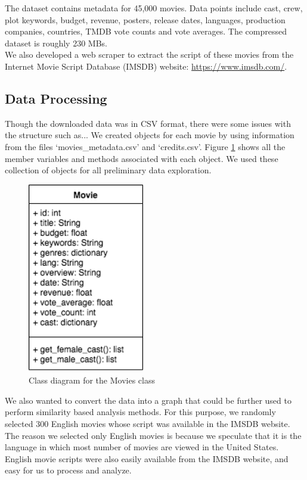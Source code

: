 \documentclass[12pt]{article}
\begin{document}
The dataset contains metadata for 45,000 movies. Data points include cast, crew, plot keywords, budget, revenue, posters, release dates, languages, production companies, countries, TMDB vote counts and vote averages. The compressed dataset is roughly 230 MBs. \\

We also developed a web scraper to extract the script of these movies from the Internet Movie Script Database (IMSDB) website: \url{https://www.imsdb.com/}.

\subsection{Data Processing}
Though the downloaded data was in CSV format, there were some issues with the structure such as... We created objects for each movie by using information from the files `movies\_metadata.csv' and `credits.csv'. Figure \ref{movie} shows all the member variables and methods associated with each object. We used these collection of objects for all preliminary data exploration. \\

\begin{figure}[H]
\begin{center}
\includegraphics[width=2in]{movie_class_diagram.png}
\end{center}
\caption{Class diagram for the Movies class}
\label{movie}
\end{figure}

We also wanted to convert the data into a graph that could be further used to perform similarity based analysis methods. For this purpose, we randomly selected 300 English movies whose script was available in the IMSDB website. The reason we selected only English movies is because we speculate that it is the language in which most number of movies are viewed in the United States. English movie scripts were also easily available from the IMSDB website, and easy for us to process and analyze.\\
\end{document}
